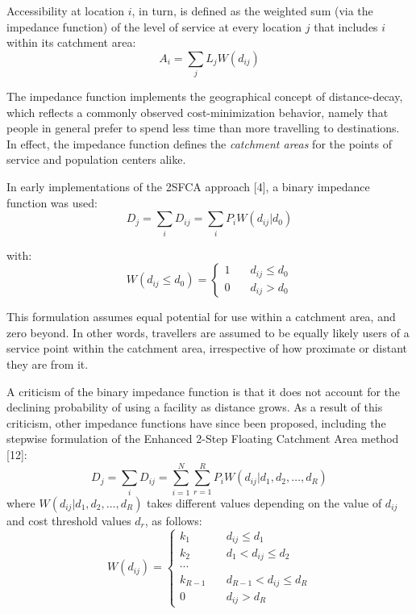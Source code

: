 \documentclass[10pt,letterpaper]{article}
\begin{document}
Accessibility at location \(i\), in turn, is defined as the weighted sum
(via the impedance function) of the level of service at every location
\(j\) that includes \(i\) within its catchment area: \[
A_i = \sum_j{L_jW(d_{ij})}
\]

The impedance function implements the geographical concept of
distance-decay, which reflects a commonly observed cost-minimization
behavior, namely that people in general prefer to spend less time than
more travelling to destinations. In effect, the impedance function
defines the \emph{catchment areas} for the points of service and
population centers alike.

In early implementations of the 2SFCA approach {[}4{]}, a binary
impedance function was used: \[
D_j = \sum_iD_{ij} = \sum_iP_iW(d_{ij}|d_0)
\]

with: \[
W(d_{ij}\leq d_0) = \left\{
        \begin{array}{ll}
            1 & \quad d_{ij} \leq d_0 \\
            0 & \quad d_{ij} > d_0
        \end{array}
    \right.
\]

This formulation assumes equal potential for use within a catchment
area, and zero beyond. In other words, travellers are assumed to be
equally likely users of a service point within the catchment area,
irrespective of how proximate or distant they are from it.

A criticism of the binary impedance function is that it does not account
for the declining probability of using a facility as distance grows. As
a result of this criticism, other impedance functions have since been
proposed, including the stepwise formulation of the Enhanced 2-Step
Floating Catchment Area method {[}12{]}: \[
D_j = \sum_iD_{ij} = \sum_{i=1}^N\sum_{r=1}^R P_iW(d_{ij}|d_1, d_2, \dots, d_R)
\] where \(W(d_{ij}|d_1, d_2, \dots, d_R)\) takes different values
depending on the value of \(d_{ij}\) and cost threshold values \(d_r\),
as follows: \[
W(d_{ij}) = \left\{
        \begin{array}{ll}
            k_1 & \quad d_{ij} \leq d_1 \\
            k_2 & \quad d_1 < d_{ij} \leq d_2 \\
            \dotsb \\
            k_{R-1} & \quad d_{R-1} < d_{ij} \leq d_R \\
            0 & \quad d_{ij} > d_R
        \end{array}
    \right.
\]
\end{document}
